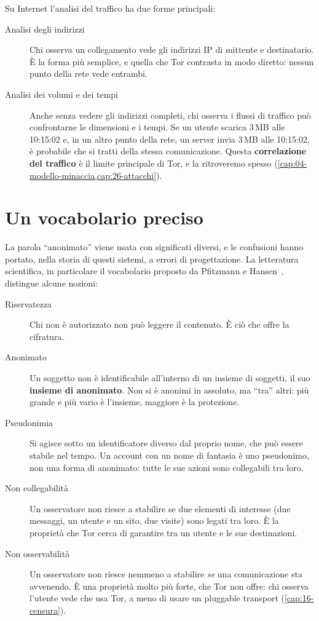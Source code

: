 Su Internet l'analisi del traffico ha due forme principali:
\begin{description}
  \item[Analisi degli indirizzi] Chi osserva un collegamento vede gli indirizzi IP di mittente e destinatario. È la forma più semplice, e quella che Tor contrasta in modo diretto: nessun punto della rete vede entrambi.
  \item[Analisi dei volumi e dei tempi] Anche senza vedere gli indirizzi completi, chi osserva i flussi di traffico può confrontarne le dimensioni e i tempi. Se un utente scarica 3\,MB alle 10:15:02 e, in un altro punto della rete, un server invia 3\,MB alle 10:15:02, è probabile che si tratti della stessa comunicazione. Questa \textbf{correlazione del traffico} è il limite principale di Tor, e la ritroveremo spesso (\cref{cap:04-modello-minaccia,cap:26-attacchi}).
\end{description}

\section{Un vocabolario preciso}\label{sec:anon-termini}

La parola \enquote{anonimato} viene usata con significati diversi, e le confusioni hanno portato, nella storia di questi sistemi, a errori di progettazione. La letteratura scientifica, in particolare il vocabolario proposto da Pfitzmann e Hansen~\cite{pfitzmann2010terminology}, distingue alcune nozioni:
\begin{description}
  \item[Riservatezza] Chi non è autorizzato non può leggere il contenuto. È ciò che offre la cifratura.
  \item[Anonimato] Un soggetto non è identificabile all'interno di un insieme di soggetti, il suo \textbf{insieme di anonimato}. Non si è anonimi in assoluto, ma \enquote{tra} altri: più grande e più vario è l'insieme, maggiore è la protezione.
  \item[Pseudonimia] Si agisce sotto un identificatore diverso dal proprio nome, che può essere stabile nel tempo. Un account con un nome di fantasia è uno pseudonimo, non una forma di anonimato: tutte le sue azioni sono collegabili tra loro.
  \item[Non collegabilità] Un osservatore non riesce a stabilire se due elementi di interesse (due messaggi, un utente e un sito, due visite) sono legati tra loro. È la proprietà che Tor cerca di garantire tra un utente e le sue destinazioni.
  \item[Non osservabilità] Un osservatore non riesce nemmeno a stabilire \emph{se} una comunicazione sta avvenendo. È una proprietà molto più forte, che Tor non offre: chi osserva l'utente vede che usa Tor, a meno di usare un pluggable transport (\cref{cap:16-censura}).
\end{description}

